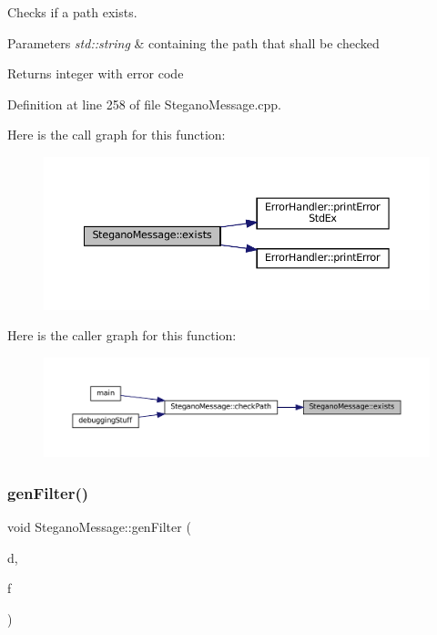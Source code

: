 Checks if a path exists. 


\begin{DoxyParams}{Parameters}
{\em std\+::string} & containing the path that shall be checked \\
\hline
\end{DoxyParams}
\begin{DoxyReturn}{Returns}
integer with error code 
\end{DoxyReturn}


Definition at line 258 of file Stegano\+Message.\+cpp.

Here is the call graph for this function\+:
\nopagebreak
\begin{figure}[H]
\begin{center}
\leavevmode
\includegraphics[width=350pt]{classSteganoMessage_acc5a49a35b46d8bf4c40cca8b8c5a52b_cgraph}
\end{center}
\end{figure}
Here is the caller graph for this function\+:
\nopagebreak
\begin{figure}[H]
\begin{center}
\leavevmode
\includegraphics[width=350pt]{classSteganoMessage_acc5a49a35b46d8bf4c40cca8b8c5a52b_icgraph}
\end{center}
\end{figure}
\mbox{\label{classSteganoMessage_a1cb326688e9a054127396d198bd6f976}} 
\subsubsection{\texorpdfstring{genFilter()}{genFilter()}}
{\footnotesize\ttfamily void Stegano\+Message\+::gen\+Filter (\begin{DoxyParamCaption}\item[{std\+::vector$<$ std\+::vector$<$ uint32\+\_\+t $>$$>$ $\ast$}]{d,  }\item[{uint32\+\_\+t($\ast$)(uint32\+\_\+t, size\+\_\+t)}]{f }\end{DoxyParamCaption})\hspace{0.3cm}{\ttfamily [private]}}



